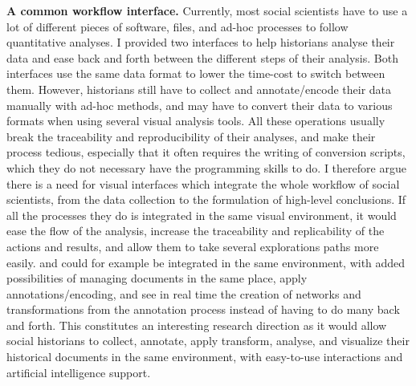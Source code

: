 \noindent\textbf{A common workflow interface.} Currently, most social scientists have to use a lot of different pieces of software, files, and ad-hoc processes to follow quantitative analyses.
I provided two \va interfaces to help historians analyse their data and ease back and forth between the different steps of their analysis.
Both interfaces use the same data format to lower the time-cost to switch between them.
However, historians still have to collect and annotate/encode their data manually with ad-hoc methods, and may have to convert their data to various formats when using several visual analysis tools.
All these operations usually break the traceability and reproducibility of their analyses, and make their process tedious, especially that it often requires the writing of conversion scripts, which they do not necessary have the programming skills to do.
I therefore argue there is a need for visual interfaces which integrate the whole workflow of social scientists, from the data collection to the formulation of high-level conclusions.
If all the processes they do is integrated in the same visual environment, it would ease the flow of the analysis, increase the traceability and replicability of the actions and results, and allow them to take several explorations paths more easily.
\combinet and \pkclustering could for example be integrated in the same environment, with added possibilities of managing documents in the same place, apply annotations/encoding, and see in real time the creation of networks and transformations from the annotation process instead of having to do many back and forth.
This constitutes an interesting research direction as it would allow social historians to collect, annotate, apply transform, analyse, and visualize their historical documents in the same environment, with easy-to-use interactions and artificial intelligence support.





